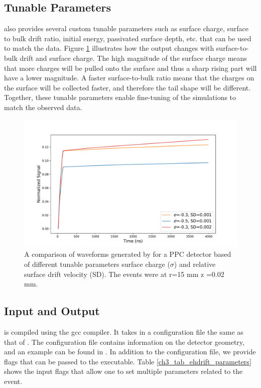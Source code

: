 \subsection{Tunable Parameters}
{\ehd} also provides several custom tunable parameters such as surface charge, surface to bulk drift ratio, initial energy, passivated surface depth, etc. that can be used to match the data. Figure \ref{fig:wf_comp} illustrates how the output changes with surface-to-bulk drift and surface charge. The high magnitude of the surface charge means that more charges will be pulled onto the surface and thus a sharp rising part will have a lower magnitude. A faster surface-to-bulk ratio means that the charges on the surface will be collected faster, and therefore the tail shape will be different. Together, these tunable parameters enable fine-tuning of the simulations to match the observed data.

\begin{figure}%
    \includegraphics[trim={0.1cm 0.3cm 1.3cm 0.3cm},clip,width=0.99\linewidth]{ch3/figs/wf_comp.pdf}
    \caption{A comparison of waveforms generated by {\ehd} for a {\Ltwo} PPC detector based of different tunable parameters surface charge ($\sigma$) and relative surface drift velocity (SD). The events were at r=15 mm z =0.02 mm.}
    \label{fig:wf_comp}
\end{figure}


\subsection{Input and Output}
{\ehd} is compiled using the gcc compiler. It takes in a configuration file the same as that of {\siggen}. The configuration file contains information on the detector geometry, and an example can be found in \cite{ehdrift2024}. In addition to the configuration file, we provide flags that can be passed to the executable. Table \ref{ch3_tab_ehdrift_parameters} shows the input flags that allow one to set multiple parameters related to the event.




